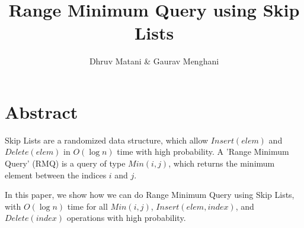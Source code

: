 \documentclass{article}
\title{Range Minimum Query using Skip Lists}
\author{Dhruv Matani \& Gaurav Menghani}
\begin{document}
\maketitle


\section{Abstract}
Skip Lists are a randomized data structure, which allow $Insert(elem)$ and $Delete(elem)$
in $O(\log{n})$ time with high probability. A 'Range Minimum Query' (RMQ) is a query of type
$Min(i,j)$, which returns the minimum element between the indices $i$ and $j$.

In this paper, we show how we can do Range Minimum Query using Skip Lists, with $O(\log{n})$
time for all $Min(i,j)$, $Insert(elem, index)$, and $Delete(index)$ operations with
high probability.
\end{document}
